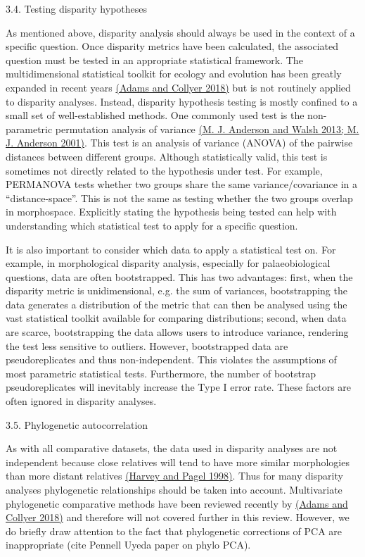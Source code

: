 \protect\hypertarget{anchor-2}{}{}3.4. Testing disparity hypotheses

As mentioned above, disparity analysis should always be used in the
context of a specific question. Once disparity metrics have been
calculated, the associated question must be tested in an appropriate
statistical framework. The multidimensional statistical toolkit for
ecology and evolution has been greatly expanded in recent years
\href{https://paperpile.com/c/sTGYvp/ZnDd}{(Adams and Collyer 2018)} but
is not routinely applied to disparity analyses. Instead, disparity
hypothesis testing is mostly confined to a small set of well-established
methods. One commonly used test is the non-parametric permutation
analysis of variance \href{https://paperpile.com/c/sTGYvp/3hy2+SC6L}{(M.
J. Anderson and Walsh 2013; M. J. Anderson 2001)}. This test is an
analysis of variance (ANOVA) of the pairwise distances between different
groups. Although statistically valid, this test is sometimes not
directly related to the hypothesis under test. For example, PERMANOVA
tests whether two groups share the same variance/covariance in a
``distance-space''. This is not the same as testing whether the two
groups overlap in morphospace. Explicitly stating the hypothesis being
tested can help with understanding which statistical test to apply for a
specific question.

It is also important to consider which data to apply a statistical test
on. For example, in morphological disparity analysis, especially for
palaeobiological questions, data are often bootstrapped. This has two
advantages: first, when the disparity metric is unidimensional, e.g. the
sum of variances, bootstrapping the data generates a distribution of the
metric that can then be analysed using the vast statistical toolkit
available for comparing distributions; second, when data are scarce,
bootstrapping the data allows users to introduce variance, rendering the
test less sensitive to outliers. However, bootstrapped data are
pseudoreplicates and thus non-independent. This violates the assumptions
of most parametric statistical tests. Furthermore, the number of
bootstrap pseudoreplicates will inevitably increase the Type I error
rate. These factors are often ignored in disparity analyses.

3.5. Phylogenetic autocorrelation

As with all comparative datasets, the data used in disparity analyses
are not independent because close relatives will tend to have more
similar morphologies than more distant relatives
\href{https://paperpile.com/c/sTGYvp/WXik}{(Harvey and Pagel 1998)}.
Thus for many disparity analyses phylogenetic relationships should be
taken into account. Multivariate phylogenetic comparative methods have
been reviewed recently by
\href{https://paperpile.com/c/sTGYvp/ZnDd}{(Adams and Collyer 2018)} and
therefore will not covered further in this review. However, we do
briefly draw attention to the fact that phylogenetic corrections of PCA
are inappropriate (cite Pennell Uyeda paper on phylo PCA).

